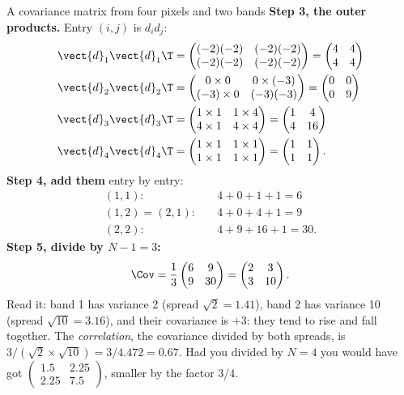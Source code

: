 \begin{worked}[label={we:linalg:cov}]{A covariance matrix from four pixels and two bands}
\textbf{Step 3, the outer products.} Entry $(i,j)$ is $d_i d_j$:
\begin{align*}
\vect{d}_1\vect{d}_1\T &= \begin{pmatrix} (-2)(-2) & (-2)(-2) \\ (-2)(-2) & (-2)(-2)\end{pmatrix}
  = \begin{pmatrix} 4 & 4 \\ 4 & 4 \end{pmatrix}\\
\vect{d}_2\vect{d}_2\T &= \begin{pmatrix} 0\times0 & 0\times(-3) \\ (-3)\times0 & (-3)(-3)\end{pmatrix}
  = \begin{pmatrix} 0 & 0 \\ 0 & 9 \end{pmatrix}\\
\vect{d}_3\vect{d}_3\T &= \begin{pmatrix} 1\times1 & 1\times4 \\ 4\times1 & 4\times4\end{pmatrix}
  = \begin{pmatrix} 1 & 4 \\ 4 & 16 \end{pmatrix}\\
\vect{d}_4\vect{d}_4\T &= \begin{pmatrix} 1\times1 & 1\times1 \\ 1\times1 & 1\times1\end{pmatrix}
  = \begin{pmatrix} 1 & 1 \\ 1 & 1 \end{pmatrix}.
\end{align*}
\textbf{Step 4, add them} entry by entry:
\begin{align*}
(1,1):&\quad 4 + 0 + 1 + 1 = 6\\
(1,2) = (2,1):&\quad 4 + 0 + 4 + 1 = 9\\
(2,2):&\quad 4 + 9 + 16 + 1 = 30 .
\end{align*}
\textbf{Step 5, divide by $N - 1 = 3$:}
\[
\Cov = \frac{1}{3}\begin{pmatrix} 6 & 9 \\ 9 & 30 \end{pmatrix}
     = \begin{pmatrix} 2 & 3 \\ 3 & 10 \end{pmatrix}.
\]
Read it: band 1 has variance 2 (spread $\sqrt2 = 1.41$), band 2 has variance 10 (spread
$\sqrt{10} = 3.16$), and their covariance is $+3$: they tend to rise and fall together. The
\emph{correlation}, the covariance divided by both spreads, is
$3/(\sqrt2\times\sqrt{10}) = 3/4.472 = 0.67$. Had you divided by $N = 4$ you would have got
$\begin{pmatrix} 1.5 & 2.25 \\ 2.25 & 7.5\end{pmatrix}$, smaller by the factor $3/4$.
\end{worked}

